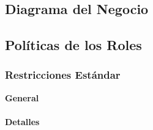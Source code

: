 \documentclass[
]{article}
\begin{document}
\hypertarget{diagrama-del-negocio}{%
\subsection{\texorpdfstring{Diagrama del Negocio
}{Diagrama del Negocio }}\label{diagrama-del-negocio}}

\hypertarget{section}{%
\subsection{}\label{section}}

\hypertarget{poluxedticas-de-los-roles}{%
\subsection{Políticas de los Roles}\label{poluxedticas-de-los-roles}}

\hypertarget{restricciones-estuxe1ndar}{%
\subsubsection{Restricciones Estándar}\label{restricciones-estuxe1ndar}}

\textbf{General}

\hypertarget{detalles}{%
\paragraph{Detalles}\label{detalles}}
\end{document}
